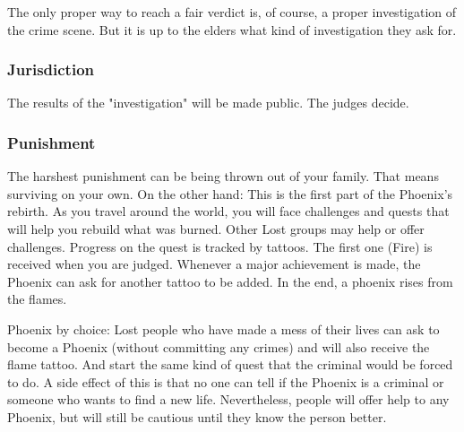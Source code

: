 The only proper way to reach a fair verdict is, of course, a proper investigation of the crime scene. But it is up to the elders what kind of investigation they ask for.

\subsubsection{Jurisdiction}

The results of the "investigation" will be made public. The judges decide.

\subsubsection{Punishment}

The harshest punishment can be being thrown out of your family. That means surviving on your own. On the other hand: This is the first part of the Phoenix's rebirth. As you travel around the world, you will face challenges and quests that will help you rebuild what was burned. Other Lost groups may help or offer challenges.
Progress on the quest is tracked by tattoos. The first one (Fire) is received when you are judged. Whenever a major achievement is made, the Phoenix can ask for another tattoo to be added. In the end, a phoenix rises from the flames.

Phoenix by choice: Lost people who have made a mess of their lives can ask to become a Phoenix (without committing any crimes) and will also receive the flame tattoo. And start the same kind of quest that the criminal would be forced to do. A side effect of this is that no one can tell if the Phoenix is a criminal or someone who wants to find a new life. Nevertheless, people will offer help to any Phoenix, but will still be cautious until they know the person better.


